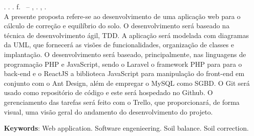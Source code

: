 
\begin{resumo}[ABSTRACT]
\begin{SingleSpacing}

\imprimirautorcitacao. \imprimirtitleabstract. \imprimirdata. \pageref {LastPage} f. \imprimirprojeto\ – \imprimirprograma, \imprimirinstituicao. \imprimirlocal, \imprimirdata.\\

A presente proposta refere-se ao desenvolvimento de uma aplicação web para o cálculo de correção e equilíbrio do solo. O desenvolvimento será baseado na técnica de desenvolvimento ágil, TDD. A aplicação será modelada com diagramas da UML, que fornecerá as visões de funcionalidades, organização de classes e implantação. O desenvolvimento será baseado, principalmente, nas linguagens de programação PHP e JavaScript, sendo o Laravel o framework PHP para para o back-end e o ReactJS a biblioteca JavaScript para manipulação do front-end em conjunto com o Ant Design, além de empregar o MySQL como SGBD. O Git será usado como repositório de código e este será hospedado no Github. O gerenciamento das tarefas será feito com o Trello, que proporcionará, de forma visual, uma visão geral do andamento do desenvolvimento do projeto.

\textbf{Keywords}: Web application. Software engenieering. Soil balance. Soil correction.

\end{SingleSpacing}
\end{resumo}

